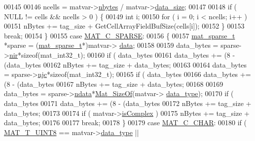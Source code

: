 \begin{DoxyCode}
00145 
00146             ncells = matvar->\hyperlink{group___m_a_t_abf1c844540503be2df9bb3db93cfe307}{nbytes} / matvar->\hyperlink{group___m_a_t_a9ad1c82e2b568da617e12dc73a26e1f9}{data\_size};
00147 
00148             \textcolor{keywordflow}{if} ( NULL != cells && ncells > 0 ) \{
00149                 \textcolor{keywordtype}{int} i;
00150                 \textcolor{keywordflow}{for} ( i = 0; i < ncells; i++ )
00151                     nBytes += tag\_size + GetCellArrayFieldBufSize(cells[i]);
00152             \}
00153             \textcolor{keywordflow}{break};
00154         \}
00155         \textcolor{keywordflow}{case} \hyperlink{group___m_a_t_ggad4d60ae7b709fc81bfd744fb4c857c40a0d5655b7e6178a2242cb3bb56ff4c8d2}{MAT\_C\_SPARSE}:
00156         \{
00157             \hyperlink{group___m_a_t_structmat__sparse__t}{mat\_sparse\_t} *sparse = (\hyperlink{group___m_a_t_structmat__sparse__t}{mat\_sparse\_t}*)matvar->
      \hyperlink{group___m_a_t_a5672978efa230bbdecdf38ede781f7fa}{data};
00158 
00159             data\_bytes = sparse->\hyperlink{group___m_a_t_aa64636ad57cf87f7a28ff5018437a850}{nir}*\textcolor{keyword}{sizeof}(mat\_int32\_t);
00160             \textcolor{keywordflow}{if} ( data\_bytes %
00161                 data\_bytes += (8 - (data\_bytes %
00162             nBytes += tag\_size + data\_bytes;
00163 
00164             data\_bytes = sparse->\hyperlink{group___m_a_t_a482d8e4b40aa975f0c1daf146ebe08a4}{njc}*\textcolor{keyword}{sizeof}(mat\_int32\_t);
00165             \textcolor{keywordflow}{if} ( data\_bytes %
00166                 data\_bytes += (8 - (data\_bytes %
00167             nBytes += tag\_size + data\_bytes;
00168 
00169             data\_bytes = sparse->\hyperlink{group___m_a_t_a1beb8a8c58a808207cbea650563a9b63}{ndata}*\hyperlink{group__mat__util_gab6774aabdc124c540c1e7686d0804940}{Mat\_SizeOf}(matvar->
      \hyperlink{group___m_a_t_ab6aafe9bd77f0f077852593dec438144}{data\_type});
00170             \textcolor{keywordflow}{if} ( data\_bytes %
00171                 data\_bytes += (8 - (data\_bytes %
00172             nBytes += tag\_size + data\_bytes;
00173 
00174             \textcolor{keywordflow}{if} ( matvar->\hyperlink{group___m_a_t_aeb03b3a69f108dc05470b00443a43739}{isComplex} )
00175                 nBytes += tag\_size + data\_bytes;
00176 
00177             \textcolor{keywordflow}{break};
00178         \}
00179         \textcolor{keywordflow}{case} \hyperlink{group___m_a_t_ggad4d60ae7b709fc81bfd744fb4c857c40aacdec5834df0861130b393697646119c}{MAT\_C\_CHAR}:
00180             \textcolor{keywordflow}{if} ( \hyperlink{group___m_a_t_ggacf7b3b879282b7ab3a51190e49bf3453a01c1bd7db68f90552862eb5d311be408}{MAT\_T\_UINT8} == matvar->\hyperlink{group___m_a_t_ab6aafe9bd77f0f077852593dec438144}{data\_type} ||

\end{DoxyCode}
